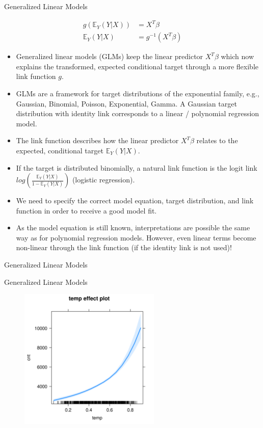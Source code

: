 \documentclass[11pt,compress,t,notes=noshow, aspectratio=169, xcolor=table]{beamer}
\begin{document}
\begin{vbframe}{Generalized Linear Models}

\begin{align*}
g\left(\mathbb{E}_Y(Y \vert X)\right) &= X^T\beta \\
\mathbb{E}_Y \left(Y \vert X\right) &= g^{-1}(X^T\beta) 
\end{align*}
\begin{itemize}
\setlength\itemsep{2em}
\item Generalized linear models (GLMs) keep the linear predictor $X^T\beta$ which now explains the transformed, expected conditional target through a more flexible link function $g$.
\item GLMs are a framework for target distributions of the exponential family, e.g., Gaussian, Binomial, Poisson, Exponential, Gamma. A Gaussian target distribution with identity link corresponds to a linear / polynomial regression model.
\item The link function describes how the linear predictor $X^T\beta$ relates to the expected, conditional target $\mathbb{E}_Y(Y \vert X)$.
\item If the target is distributed binomially, a natural link function is the logit link $log\left(\frac{\mathbb{E}_Y(Y \vert X)}{1 - \mathbb{E}_Y(Y \vert X)}\right)$ (logistic regression).
\item We need to specify the correct model equation, target distribution, and link function in order to receive a good model fit.
\item As the model equation is still known, interpretations are possible the same way as for polynomial regression models. However, even linear terms become non-linear through the link function (if the identity link is not used)!
\end{itemize}
\end{vbframe}


\begin{vbframe}{Generalized Linear Models}
\tiny

\end{vbframe}

\begin{vbframe}{Generalized Linear Models}
\begin{figure}
  \includegraphics[width = 0.6\textwidth]{figure/glm_effect_plot.png}
\end{figure}
\end{vbframe}
\end{document}
